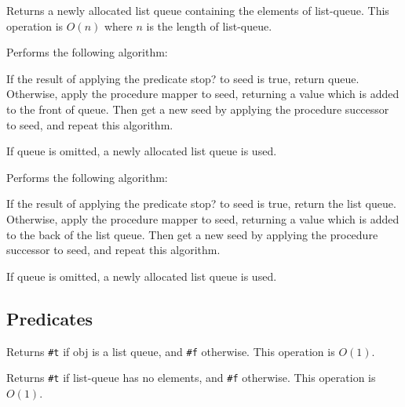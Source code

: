 \begin{entry}{%
  }

  Returns a newly allocated list queue containing the elements of
  list-queue. This operation is $O(n)$ where $n$ is the length of
  list-queue.
\end{entry}

\begin{entry}{%
  }

  Performs the following algorithm:

  If the result of applying the predicate stop? to seed is true,
  return queue. Otherwise, apply the procedure mapper to seed,
  returning a value which is added to the front of queue. Then get a
  new seed by applying the procedure successor to seed, and repeat
  this algorithm.

  If queue is omitted, a newly allocated list queue is used.
\end{entry}

\begin{entry}{%
  }

  Performs the following algorithm:

  If the result of applying the predicate stop? to seed is true,
  return the list queue. Otherwise, apply the procedure mapper to
  seed, returning a value which is added to the back of the list
  queue. Then get a new seed by applying the procedure successor to
  seed, and repeat this algorithm.

  If queue is omitted, a newly allocated list queue is used.
\end{entry}

\subsection{Predicates}\label{Predicates}

\begin{entry}{%
  }

  Returns \texttt{\#t} if obj is a list queue, and \texttt{\#f}
  otherwise.  This operation is $O(1)$.
\end{entry}

\begin{entry}{%
  }

  Returns \texttt{\#t} if list-queue has no elements, and \texttt{\#f}
  otherwise. This operation is $O(1)$.
\end{entry}

